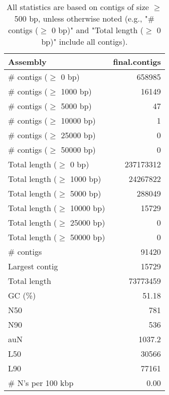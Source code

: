\documentclass[12pt,a4paper]{article}
\begin{document}
\begin{table}[ht]
\begin{center}
\caption{All statistics are based on contigs of size $\geq$ 500 bp, unless otherwise noted (e.g., "\# contigs ($\geq$ 0 bp)" and "Total length ($\geq$ 0 bp)" include all contigs).}
\begin{tabular}{|l*{1}{|r}|}
\hline
Assembly & final.contigs \\ \hline
\# contigs ($\geq$ 0 bp) & 658985 \\ \hline
\# contigs ($\geq$ 1000 bp) & 16149 \\ \hline
\# contigs ($\geq$ 5000 bp) & 47 \\ \hline
\# contigs ($\geq$ 10000 bp) & 1 \\ \hline
\# contigs ($\geq$ 25000 bp) & 0 \\ \hline
\# contigs ($\geq$ 50000 bp) & 0 \\ \hline
Total length ($\geq$ 0 bp) & 237173312 \\ \hline
Total length ($\geq$ 1000 bp) & 24267822 \\ \hline
Total length ($\geq$ 5000 bp) & 288049 \\ \hline
Total length ($\geq$ 10000 bp) & 15729 \\ \hline
Total length ($\geq$ 25000 bp) & 0 \\ \hline
Total length ($\geq$ 50000 bp) & 0 \\ \hline
\# contigs & 91420 \\ \hline
Largest contig & 15729 \\ \hline
Total length & 73773459 \\ \hline
GC (\%) & 51.18 \\ \hline
N50 & 781 \\ \hline
N90 & 536 \\ \hline
auN & 1037.2 \\ \hline
L50 & 30566 \\ \hline
L90 & 77161 \\ \hline
\# N's per 100 kbp & 0.00 \\ \hline
\end{tabular}
\end{center}
\end{table}
\end{document}
